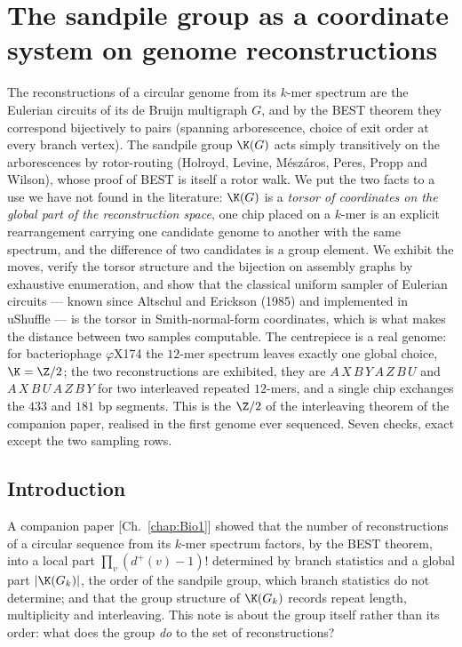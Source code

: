 \chapter{The sandpile group as a coordinate system on genome reconstructions}\label{chap:Bio2}
\begin{chapterabstract}
\noindent
The reconstructions of a circular genome from its $k$-mer spectrum are the Eulerian
circuits of its de Bruijn multigraph $G$, and by the BEST theorem they correspond
bijectively to pairs (spanning arborescence, choice of exit order at every branch vertex).
The sandpile group $\K(G)$ acts simply transitively on the arborescences by rotor-routing
(Holroyd, Levine, M\'esz\'aros, Peres, Propp and Wilson), whose proof of BEST is itself a
rotor walk. We put the two facts to a use we have not found in the literature: $\K(G)$ is
a \emph{torsor of coordinates on the global part of the reconstruction space}, one chip
placed on a $k$-mer is an explicit rearrangement carrying one candidate genome to another
with the same spectrum, and the difference of two candidates is a group element. We
exhibit the moves, verify the torsor structure and the bijection on assembly graphs by
exhaustive enumeration, and show that the classical uniform sampler of Eulerian circuits
--- known since Altschul and Erickson (1985) and implemented in uShuffle --- is the torsor
in Smith-normal-form coordinates, which is what makes the distance between two samples
computable. The centrepiece is a real genome: for bacteriophage $\varphi$X174 the $12$-mer
spectrum leaves exactly one global choice, $\K=\Z/2$; the two reconstructions are
exhibited, they are $A\,X\,B\,Y\,A\,Z\,B\,U$ and $A\,X\,B\,U\,A\,Z\,B\,Y$ for two interleaved
repeated $12$-mers, and a single chip exchanges the $433$ and $181$ bp segments. This is
the $\Z/2$ of the interleaving theorem of the companion paper, realised in the first
genome ever sequenced. Seven checks, exact except the two sampling rows.
\end{chapterabstract}

\section{Introduction}\label{Bio2:sec:intro}

A companion paper [Ch.~\ref{chap:Bio1}] showed that the number of reconstructions of a circular
sequence from its $k$-mer spectrum factors, by the BEST theorem, into a local part
$\prod_v(d^+(v)-1)!$ determined by branch statistics and a global part $|\K(G_k)|$, the
order of the sandpile group, which branch statistics do not determine; and that the group
structure of $\K(G_k)$ records repeat length, multiplicity and interleaving. This note is
about the group itself rather than its order: what does the group \emph{do} to the set of
reconstructions?

